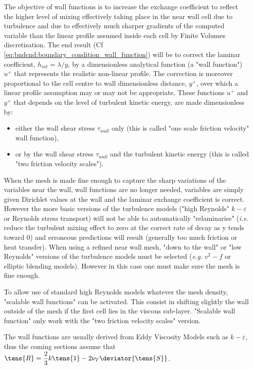 The objective of wall functions
is to increase the exchange coefficient
 to reflect the higher level of mixing effectively taking place in the near wall cell due to
turbulence and due to effectively much sharper gradients of the computed variable than the
linear profile assumed inside each cell by Finite Volumes discretisation. The end result (Cf \eqref{eq:bndcnd:boundary_condition_wall_function}) will
be to correct the laminar coefficient, $h_{int} = \lambda / y $, by a dimensionless analytical function (a
"wall function") $u^+$ that represents the realistic non-linear profile. The correction is moreover
proportional to the cell centre to wall dimensionless distance, $y^+$, over which a linear profile
assumption may or may not be appropriate.
These functions $u^+$ and $y^+$ that depends on the level of turbulent kinetic energy,
are made dimensionless by:
\begin{itemize}
\item either the wall shear stress $\tau_{wall}$ only (this is called "one scale friction velocity" wall function),
\item or by the wall shear stress $\tau_{wall}$ and the turbulent kinetic energy (this is called "two friction velocity scales").
\end{itemize}

When the mesh is made fine enough to capture the sharp variations of the variables near the
wall, wall functions are no longer needed, variables are simply given Dirichlet values at the
wall and the laminar exchange coefficient is correct. However the more basic versions of the
turbulence models ("high Reynolds" $k-\varepsilon$ or Reynolds stress transport) will not be able to
automatically "relaminarise" (\emph{i.e.} reduce the turbulent mixing effect to zero at the correct rate
of decay as y tends toward $0$) and erroneous predictions will result (generally too much friction
or heat transfer).
When using a refined near wall mesh, "down to the wall" or "low Reynolds" versions of the
turbulence models must be selected (\emph{e.g.} $v^2-f$ or elliptic blending models). However in this
case one must make sure the mesh is fine enough.

To allow use of standard high Reynolds models whatever the mesh density,
"scalable wall functions" can be activated. This consist in shifting slightly the
wall outside of the mesh if the first cell lies in the viscous sub-layer. "Scalable wall function"
only work with the "two friction velocity scales" version.

The wall functions are usually derived from Eddy Viscosity Models such as $k-\varepsilon$, thus the coming sections
assume that $\tens{R} = \dfrac{2}{3}k \tens{1} - 2\nu_T \deviator{\tens{S}}$.


